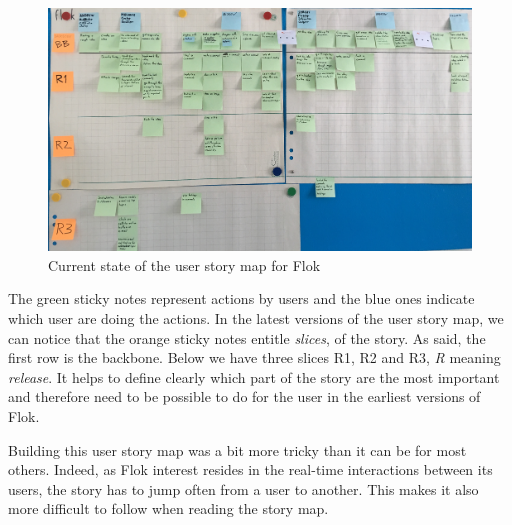 \documentclass[a4paper,12pt, oneside]{article}
\begin{document}
\begin{figure}[!htb]
\centering
\includegraphics[width=\textwidth]{images/flokUsmCurrent.jpg}
\caption{Current state of the user story map for Flok}
\label{fig.flokUsmCurrent}
\end{figure}

The green sticky notes represent actions by users and the blue ones indicate which user are doing the actions.
In the latest versions of the user story map, we can notice that the orange sticky notes entitle \emph{slices}, of the story.
As said, the first row is the backbone.
Below we have three slices R1, R2 and R3, \emph{R} meaning \emph{release}.
It helps to define clearly which part of the story are the most important and therefore need to be possible to do for the user in the earliest versions of Flok.

Building this user story map was a bit more tricky than it can be for most others.
Indeed, as Flok interest resides in the real-time interactions between its users, the story has to jump often from a user to another.
This makes it also more difficult to follow when reading the story map.
\end{document}
